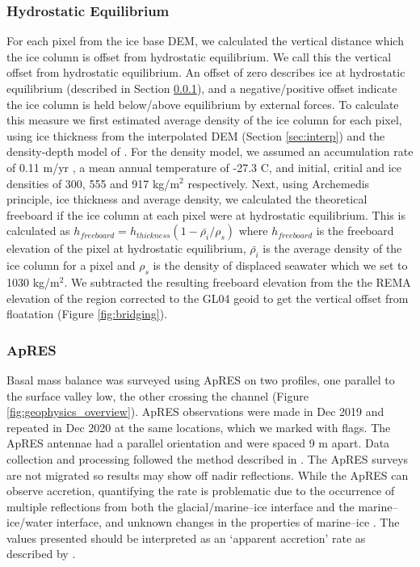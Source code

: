 \subsubsection{Hydrostatic Equilibrium} \label{sec:float}

For each pixel from the ice base DEM, we calculated the vertical distance which the ice column is offset from hydrostatic equilibrium. We call this the vertical offset from hydrostatic equilibrium.
An offset of zero describes ice at hydrostatic equilibrium (described in Section \ref{sec:float}), and a negative/positive offset indicate the ice column is held below/above equilibrium by external forces.
To calculate this measure we first estimated average density of the ice column for each pixel, using ice thickness from the interpolated DEM (Section \ref{sec:interp}) and the density-depth model of \cite{herron1980firn}. For the density model, we assumed an accumulation rate of 0.11 m/yr \citep{craig_personal_comm}, a mean annual temperature of -27.3 \textdegree C, and initial, critial and ice densities of 300, 555 and 917 kg/$\mathrm{m}^2$ respectively.
Next, using Archemedis principle, ice thickness and average density, we calculated the theoretical freeboard if the ice column at each pixel were at hydrostatic equilibrium. This is calculated as $h_{freeboard} = h_{thickness} \left( 1 - \bar{\rho_i}/\rho_s \right)$ where $h_{freeboard}$ is the freeboard elevation of the pixel at hydrostatic equilibrium, $\bar{\rho_i}$ is the average density of the ice column for a pixel and $\rho_s$ is the density of displaced seawater which we set to 1030 kg/$\mathrm{m}^2$. We subtracted the resulting freeboard elevation from the the REMA elevation of the region corrected to the GL04 geoid to get the vertical offset from floatation (Figure \ref{fig:bridging}).  

\subsubsection{ApRES} \label{sec:apres}

Basal mass balance was surveyed using ApRES on two profiles, one parallel to the surface valley low, the other crossing the channel (Figure \ref{fig:geophysics_overview}). ApRES observations were made in Dec 2019 and repeated in Dec 2020 at the same locations, which we marked with flags. The ApRES antennae had a parallel orientation and were spaced 9 m apart. Data collection and processing followed the method described in \cite{stewart2019basal}. The ApRES surveys are not migrated so results may show off nadir reflections.
While the ApRES can observe accretion, quantifying the rate is problematic due to the occurrence of multiple reflections from both the glacial/marine--ice interface and the marine--ice/water interface, and unknown changes in the properties of marine--ice  \citep{vavnkova2021nature}. The values presented should be interpreted as an `apparent accretion' rate as described by \cite{vavnkova2021nature}.

